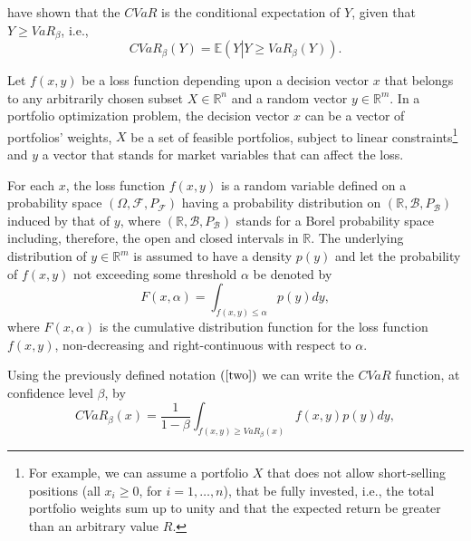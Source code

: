 \documentclass[a4paper,10pt]{article}
\begin{document}
\bigskip \citet*{uryasev1999} have shown that the $CVaR$ is the conditional expectation of $Y$, given that $Y\geq VaR_{\beta }$, i.e.,
\begin{equation}
CVaR_{\beta }\left( Y\right) =\mathbb{E}\left( Y\left\vert Y\geq VaR_{\beta}\left( Y\right) \right. \right) .  \label{three}
\end{equation}

Let $f\left( x,y\right) $ be a loss function depending upon a decision vector $x$ that belongs to any arbitrarily chosen subset $X\in\mathbb{R}^{n}$ and a random vector $y\in\mathbb{R}^{m}$. In a portfolio optimization problem, the decision vector $x$ can be a vector of portfolios' weights, $X$ be a set of feasible portfolios, subject to linear constraints\footnote{For example, we can assume a portfolio $X$ that does not allow short-selling positions (all $x_{i}\geq 0$, for $i=1,\ldots,n$), that be fully invested, i.e., the total portfolio weights sum up to unity and that the expected return be greater than an arbitrary value $R$.} and $y$ a vector that stands for market variables that can affect the loss.


For each $x$, the loss function $f\left( x,y\right) $ is a random variable defined on a probability space $\left( \Omega ,\mathcal{F},P_{\mathcal{F}}\right) $ having a probability distribution on $\left(\mathbb{R},\mathcal{B},P_{\mathcal{B}}\right) $ induced by that of $y$, where $\left(\mathbb{R},\mathcal{B},P_{\mathcal{B}}\right) $ stands for a Borel probability space
including, therefore, the open and closed intervals in $\mathbb{R}$. The underlying distribution of $y\in\mathbb{R}^{m}$ is assumed to have a density $p(y)$ and let the probability of $f\left(x,y\right) $ not exceeding some threshold $\alpha$ be denoted by
\begin{equation}
F(x,\alpha)=\int_{f(x,y)\leq \alpha}p(y)dy,  \label{four}
\end{equation}
where $F(x,\alpha)$ is the cumulative distribution function for the loss function $f\left(x,y\right) $, non-decreasing and right-continuous with respect to $\alpha$.

Using the previously defined notation $\left( \ref{two}\right) $ we can write the $CVaR$ function, at confidence level $\beta $, by
\begin{equation}
CVaR_{\beta }\left( x\right) = \frac{1}{1-\beta }\int_{f(x,y)\geq VaR_{\beta}\left( x\right)}f(x,y)p(y)dy, \label{five}
\end{equation}
\end{document}
